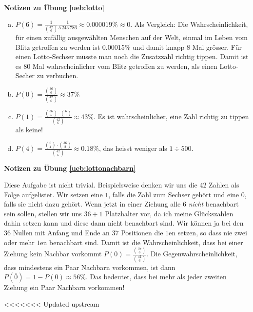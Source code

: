 \documentclass[%
<<<<<<< Updated upstream
11pt,%
twoside,%
titlepage,%
german,%
=======
11pt,%
twoside,%
titlepage,%
swissgerman,%
>>>>>>> Stashed changes
headsepline%
]{scrartcl}
\newcommand{\faReturnGray}{\textcolor{gray}{\faMailReply}} %
\theoremstyle{definition}
\theoremstyle{plain}
\newcommand{\concatueb}[1]{ueb:#1}%
\newcommand{\concatlsg}[1]{lsg:#1}%
\newenvironment{lsg}[1]{%
    \par\noindent\textbf{Notizen zu Übung \ref{\concatueb{#1}}}\label{\concatlsg{#1}}
    \hfill\hyperref[\concatueb{#1}]{\faReturnGray}\par %
}{%
    \par%
}
\newcounter{satzz}[section]\setcounter{satzz}{0}
\newcommand{\concatueb}[1]{ueb:#1}%
\newcommand{\concatlsg}[1]{lsg:#1}%
\newenvironment{lsg}[1]{%
    \par\noindent\textbf{Notizen zu Übung \ref{\concatueb{#1}}.}%
    \label{\concatlsg{#1}}
}{%
    \par%
}
\begin{document}
\begin{lsg}{lotto}
\begin{enumerate}[a)]
\item $P(6)=\frac{1}{\binom{42}{6}}\frac{1}{5\,245\,786}\approx0.000019\%\approx0$. Als Vergleich: Die Wahrscheinlichkeit, f\"ur einen zuf\"allig ausgew\"ahlten Menschen auf der Welt, einmal im Leben vom Blitz getroffen zu werden ist $0.00015\%$ und damit knapp $8$ Mal gr\"osser. F\"ur einen Lotto-Sechser m\"usste man noch die Zusatzzahl richtig tippen. Damit ist es $80$ Mal wahrscheinlicher vom Blitz getroffen zu werden, als einen Lotto-Secher zu verbuchen.
\item $P(0)=\frac{\binom{36}{6}}{\binom{42}{6}}\approx37\%$
\item $P(1)=\frac{\binom{36}{5}\cdot\binom{6}{1}}{\binom{42}{6}}\approx43\%$. Es ist wahrscheinlicher, eine Zahl richtig zu tippen als keine!
\item $P(4)=\frac{\binom{6}{4}\cdot\binom{36}{2}}{\binom{42}{6}}\approx0.18\%$, das heisst weniger als $1\div500$.
\end{enumerate}
\end{lsg}

\begin{lsg}{lottonachbarn}
Diese Aufgabe ist nicht trivial. Beispielsweise denken wir uns die $42$ Zahlen als Folge aufgelistet. Wir setzen eine $1$, falls die Zahl zum Sechser geh\"ort und eine $0$, falls sie nicht dazu geh\"ort. Wenn jetzt in einer Ziehung alle $6$ \emph{nicht} benachbart sein sollen, stellen wir uns $36+1$ Platzhalter vor, da ich meine Gl\"uckszahlen dahin setzen kann und diese dann nicht benachbart sind. Wir k\"onnen ja bei den $36$ Nullen mit Anfang und Ende an $37$ Positionen die $1$en setzen, so dass nie zwei oder mehr $1$en benachbart sind. Damit ist die Wahrscheinlichkeit, dass bei einer Ziehung kein Nachbar vorkommt $P(0)=\frac{\binom{37}{6}}{\binom{42}{6}}$. Die Gegenwahrscheinlichkeit, dass mindestens ein Paar Nachbarn vorkommen, ist dann $P(\overline{0})=1-P(0)\approx56\%$. Das bedeutet, dass bei mehr als jeder zweiten Ziehung ein Paar Nachbarn vorkommen!
\end{lsg}

<<<<<<< Updated upstream
\end{document}
